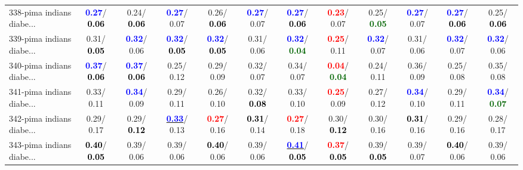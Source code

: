 \begin{table}[h]
\begin{center}
{\begin{tabular}{lc|c|c|c|c|c|c|c|c|c|c}
338-pima indians diabe... & \textcolor{blue}{\textbf{  0.27}}/\textcolor{black}{\textbf{  0.06}} &   0.24/\textcolor{black}{\textbf{  0.06}} & \textcolor{blue}{\textbf{  0.27}}/  0.07 &   0.26/\textcolor{black}{\textbf{  0.06}} & \textcolor{blue}{\textbf{  0.27}}/  0.07 & \textcolor{blue}{\textbf{  0.27}}/\textcolor{black}{\textbf{  0.06}} & \textcolor{red}{\textbf{  0.23}}/  0.07 &   0.25/\textcolor{darkgreen}{\textbf{  0.05}} & \textcolor{blue}{\textbf{  0.27}}/  0.07 & \textcolor{blue}{\textbf{  0.27}}/\textcolor{black}{\textbf{  0.06}} &   0.25/\textcolor{black}{\textbf{  0.06}} \\
339-pima indians diabe... &   0.31/\textcolor{black}{\textbf{  0.05}} & \textcolor{blue}{\textbf{  0.32}}/  0.06 & \textcolor{blue}{\textbf{  0.32}}/\textcolor{black}{\textbf{  0.05}} & \textcolor{blue}{\textbf{  0.32}}/\textcolor{black}{\textbf{  0.05}} &   0.31/  0.06 & \textcolor{blue}{\textbf{  0.32}}/\textcolor{darkgreen}{\textbf{  0.04}} & \textcolor{red}{\textbf{  0.25}}/  0.11 & \textcolor{blue}{\textbf{  0.32}}/  0.07 &   0.31/  0.06 & \textcolor{blue}{\textbf{  0.32}}/  0.07 & \textcolor{blue}{\textbf{  0.32}}/  0.06 \\
340-pima indians diabe... & \textcolor{blue}{\textbf{  0.37}}/\textcolor{black}{\textbf{  0.06}} & \textcolor{blue}{\textbf{  0.37}}/\textcolor{black}{\textbf{  0.06}} &   0.25/  0.12 &   0.29/  0.09 &   0.32/  0.07 &   0.34/  0.07 & \textcolor{red}{\textbf{  0.04}}/\textcolor{darkgreen}{\textbf{  0.04}} &   0.24/  0.11 &   0.36/  0.09 &   0.25/  0.08 &   0.35/  0.08 \\
341-pima indians diabe... &   0.33/  0.11 & \textcolor{blue}{\textbf{  0.34}}/  0.09 &   0.29/  0.11 &   0.26/  0.10 &   0.32/\textcolor{black}{\textbf{  0.08}} &   0.33/  0.10 & \textcolor{red}{\textbf{  0.25}}/  0.09 &   0.27/  0.12 & \textcolor{blue}{\textbf{  0.34}}/  0.10 &   0.29/  0.11 & \textcolor{blue}{\textbf{  0.34}}/\textcolor{darkgreen}{\textbf{  0.07}} \\ \hline
342-pima indians diabe... &   0.29/  0.17 &   0.29/\textcolor{black}{\textbf{  0.12}} & \underline{\textcolor{blue}{\textbf{  0.33}}}/  0.13 & \textcolor{red}{\textbf{  0.27}}/  0.16 & \textcolor{black}{\textbf{  0.31}}/  0.14 & \textcolor{red}{\textbf{  0.27}}/  0.18 &   0.30/\textcolor{black}{\textbf{  0.12}} &   0.30/  0.16 & \textcolor{black}{\textbf{  0.31}}/  0.16 &   0.29/  0.16 &   0.28/  0.17 \\
343-pima indians diabe... & \textcolor{black}{\textbf{  0.40}}/\textcolor{black}{\textbf{  0.05}} &   0.39/  0.06 &   0.39/  0.06 & \textcolor{black}{\textbf{  0.40}}/  0.06 &   0.39/  0.06 & \underline{\textcolor{blue}{\textbf{  0.41}}}/\textcolor{black}{\textbf{  0.05}} & \textcolor{red}{\textbf{  0.37}}/\textcolor{black}{\textbf{  0.05}} &   0.39/\textcolor{black}{\textbf{  0.05}} &   0.39/  0.07 & \textcolor{black}{\textbf{  0.40}}/  0.06 &   0.39/  0.06 \\

\end{tabular}}
\end{center}
\end{table}
